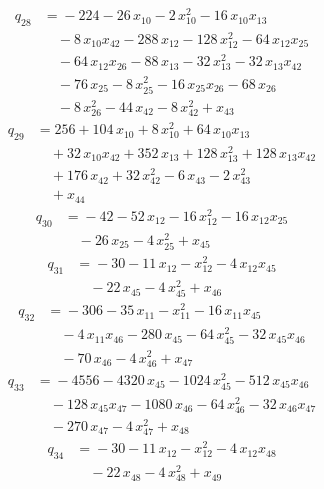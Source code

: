 \documentclass[11pt]{article}
\theoremstyle{remark}\newtheorem{remark}[theorem]{Remark}
\begin{document}
\begin{align*}
q_{28} &={}-224 -26\,x_{10} -2\,x_{10}^{2} -16\,x_{10}x_{13}\\
&\quad -8\,x_{10}x_{42} -288\,x_{12} -128\,x_{12}^{2} -64\,x_{12}x_{25}\\
&\quad -64\,x_{12}x_{26} -88\,x_{13} -32\,x_{13}^{2} -32\,x_{13}x_{42}\\
&\quad -76\,x_{25} -8\,x_{25}^{2} -16\,x_{25}x_{26} -68\,x_{26}\\
&\quad -8\,x_{26}^{2} -44\,x_{42} -8\,x_{42}^{2} +x_{43}
\end{align*}
\begin{align*}
q_{29} &={}256 +104\,x_{10} +8\,x_{10}^{2} +64\,x_{10}x_{13}\\
&\quad +32\,x_{10}x_{42} +352\,x_{13} +128\,x_{13}^{2} +128\,x_{13}x_{42}\\
&\quad +176\,x_{42} +32\,x_{42}^{2} -6\,x_{43} -2\,x_{43}^{2}\\
&\quad +x_{44}
\end{align*}
\begin{align*}
q_{30} &={}-42 -52\,x_{12} -16\,x_{12}^{2} -16\,x_{12}x_{25}\\
&\quad -26\,x_{25} -4\,x_{25}^{2} +x_{45}
\end{align*}
\begin{align*}
q_{31} &={}-30 -11\,x_{12} -x_{12}^{2} -4\,x_{12}x_{45}\\
&\quad -22\,x_{45} -4\,x_{45}^{2} +x_{46}
\end{align*}
\begin{align*}
q_{32} &={}-306 -35\,x_{11} -x_{11}^{2} -16\,x_{11}x_{45}\\
&\quad -4\,x_{11}x_{46} -280\,x_{45} -64\,x_{45}^{2} -32\,x_{45}x_{46}\\
&\quad -70\,x_{46} -4\,x_{46}^{2} +x_{47}
\end{align*}
\begin{align*}
q_{33} &={}-4556 -4320\,x_{45} -1024\,x_{45}^{2} -512\,x_{45}x_{46}\\
&\quad -128\,x_{45}x_{47} -1080\,x_{46} -64\,x_{46}^{2} -32\,x_{46}x_{47}\\
&\quad -270\,x_{47} -4\,x_{47}^{2} +x_{48}
\end{align*}
\begin{align*}
q_{34} &={}-30 -11\,x_{12} -x_{12}^{2} -4\,x_{12}x_{48}\\
&\quad -22\,x_{48} -4\,x_{48}^{2} +x_{49}
\end{align*}
\end{document}

